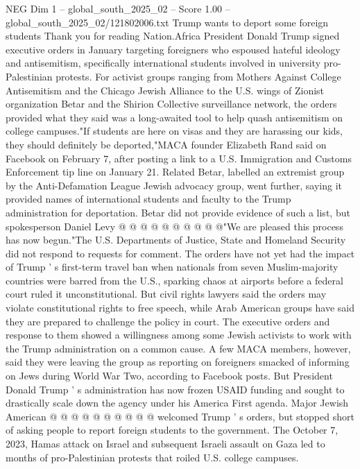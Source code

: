 \begin{textsample}{NEG Dim 1 – global\_south\_2025\_02 – Score 1.00 – global\_south\_2025\_02/121802006.txt}  \label{ex:f1_neg_037}
Trump wants to deport some foreign students Thank you for reading Nation.Africa President Donald Trump signed executive orders in January targeting foreigners who espoused hateful ideology and antisemitism, specifically international students involved in university pro-Palestinian protests.
For activist groups ranging from Mothers Against College Antisemitism and the Chicago Jewish Alliance to the U.S. wings of Zionist organization Betar and the Shirion Collective surveillance network, the orders provided what they said was a long-awaited tool to help quash antisemitism on college campuses."If students are here on visas and they are harassing our kids, they should definitely be deported,"MACA founder Elizabeth Rand said on Facebook on February 7, after posting a link to a U.S.
Immigration and Customs Enforcement tip line on January 21.
Related Betar, labelled an extremist group by the Anti-Defamation League Jewish advocacy group, went further, saying it provided names of international students and faculty to the Trump administration for deportation.
Betar did not provide evidence of such a list, but spokesperson Daniel Levy @ @ @ @ @ @ @ @ @ @"We are pleased this process has now begun."The U.S.
Departments of Justice, State and Homeland Security did not respond to requests for comment.
The orders have not yet had the impact of Trump ' s first-term travel ban when nationals from seven Muslim-majority countries were barred from the U.S., sparking chaos at airports before a federal court ruled it unconstitutional.
But civil rights lawyers said the orders may violate constitutional rights to free speech, while Arab American groups have said they are prepared to challenge the policy in court.
The executive orders and response to them showed a willingness among some Jewish activists to work with the Trump administration on a common cause.
A few MACA members, however, said they were leaving the group as reporting on foreigners smacked of informing on Jews during World War Two, according to Facebook posts.
But President Donald Trump ' s administration has now frozen USAID funding and sought to drastically scale down the agency under his America First agenda.
Major Jewish American @ @ @ @ @ @ @ @ @ @ welcomed Trump ' s orders, but stopped short of asking people to report foreign students to the government.
The October 7, 2023, Hamas attack on Israel and subsequent Israeli assault on Gaza led to months of pro-Palestinian protests that roiled U.S. college campuses.

\end{textsample}
